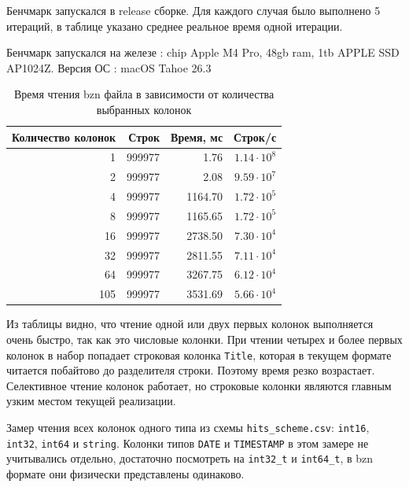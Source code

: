 \documentclass[a4paper,12pt]{extarticle}
\begin{document}
Бенчмарк запускался в release сборке. Для каждого случая было выполнено 5
итераций, в таблице указано среднее реальное время одной итерации.


Бенчмарк запускался на железе : chip Apple M4 Pro, 48gb ram, 1tb APPLE SSD AP1024Z. Версия ОС : macOS Tahoe 26.3

\begin{table}[ht]
    \caption{Время чтения bzn файла в зависимости от количества выбранных колонок}
    \label{table:bzn_read_columns_count}
    \footnotesize
    \centering
    \begin{tabular}{rrrr}
        \toprule
        Количество колонок & Строк & Время, мс & Строк/с \\
        \midrule
        1   & 999977 & 1.76    & $1.14 \cdot 10^8$ \\
        2   & 999977 & 2.08    & $9.59 \cdot 10^7$ \\
        4   & 999977 & 1164.70 & $1.72 \cdot 10^5$ \\
        8   & 999977 & 1165.65 & $1.72 \cdot 10^5$ \\
        16  & 999977 & 2738.50 & $7.30 \cdot 10^4$ \\
        32  & 999977 & 2811.55 & $7.11 \cdot 10^4$ \\
        64  & 999977 & 3267.75 & $6.12 \cdot 10^4$ \\
        105 & 999977 & 3531.69 & $5.66 \cdot 10^4$ \\
        \bottomrule
    \end{tabular}
\end{table}

Из таблицы видно, что чтение одной или двух первых колонок выполняется очень
быстро, так как это числовые колонки. При чтении
четырех и более первых колонок в набор попадает строковая колонка \texttt{Title},
которая в текущем формате читается побайтово до разделителя строки. Поэтому
время резко возрастает. Селективное чтение колонок работает,
но строковые колонки являются главным узким местом текущей реализации.

Замер чтения всех колонок одного типа из схемы
\texttt{hits\_scheme.csv}: \texttt{int16}, \texttt{int32}, \texttt{int64} и
\texttt{string}. Колонки типов \texttt{DATE} и \texttt{TIMESTAMP} в этом замере не
учитывались отдельно, достаточно посмотреть на \texttt{int32\_t} и \texttt{int64\_t},
 в bzn формате они физически представлены одинаково.
\end{document}
